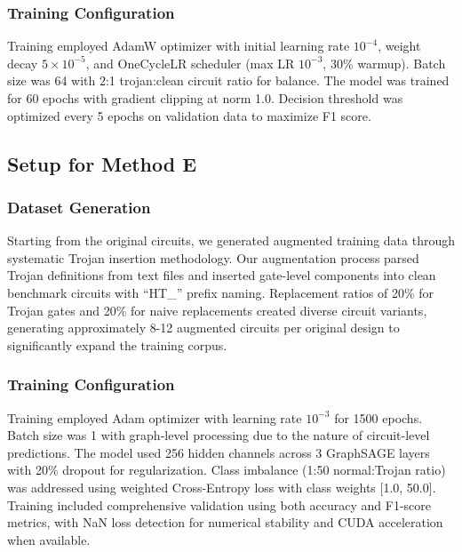 \documentclass[conference]{IEEEtran}
\begin{document}
\subsubsection{Training Configuration}
Training employed AdamW optimizer with initial learning rate $10^{-4}$, weight decay $5 \times 10^{-5}$, and OneCycleLR scheduler (max LR $10^{-3}$, 30\% warmup). Batch size was 64 with 2:1 trojan:clean circuit ratio for balance. The model was trained for 60 epochs with gradient clipping at norm 1.0. Decision threshold was optimized every 5 epochs on validation data to maximize F1 score.

\FloatBarrier

\subsection{Setup for Method E}
\subsubsection{Dataset Generation}
Starting from the original circuits, we generated augmented training data through systematic Trojan insertion methodology. Our augmentation process parsed Trojan definitions from text files and inserted gate-level components into clean benchmark circuits with ``HT\_'' prefix naming. Replacement ratios of 20\% for Trojan gates and 20\% for naive replacements created diverse circuit variants, generating approximately 8-12 augmented circuits per original design to significantly expand the training corpus.

\subsubsection{Training Configuration}
Training employed Adam optimizer with learning rate $10^{-3}$ for 1500 epochs. Batch size was 1 with graph-level processing due to the nature of circuit-level predictions. The model used 256 hidden channels across 3 GraphSAGE layers with 20\% dropout for regularization. Class imbalance (1:50 normal:Trojan ratio) was addressed using weighted Cross-Entropy loss with class weights [1.0, 50.0]. Training included comprehensive validation using both accuracy and F1-score metrics, with NaN loss detection for numerical stability and CUDA acceleration when available.

\FloatBarrier

\end{document}
